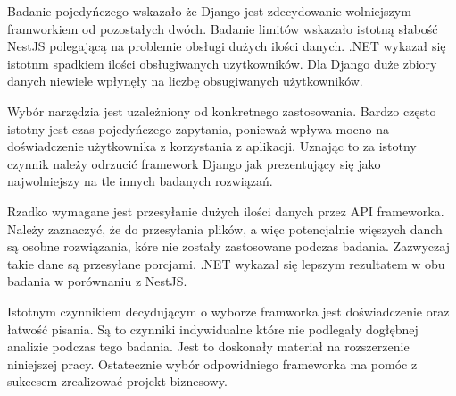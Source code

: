Badanie pojedyńczego wskazało że Django jest zdecydowanie wolniejszym framworkiem od pozostałych dwóch.
Badanie limitów wskazało istotną słabość NestJS polegającą na problemie obsługi dużych ilości danych. .NET wykazał się istotnm spadkiem ilości obsługiwanych uzytkowników.
Dla Django duże zbiory danych niewiele wpłynęły na liczbę obsugiwanych użytkowników.

Wybór narzędzia jest uzależniony od konkretnego zastosowania.
Bardzo często istotny jest czas pojedyńczego zapytania, ponieważ wpływa mocno na doświadczenie użytkownika z korzystania z aplikacji.
Uznając to za istotny czynnik należy odrzucić framework Django jak prezentujący się jako najwolniejszy na tle innych badanych rozwiązań.

Rzadko wymagane jest przesyłanie dużych ilości danych przez API frameworka.
Należy zaznaczyć, że do przesyłania plików, a więc potencjalnie więszych danch są osobne rozwiązania, kóre nie zostały zastosowane podczas badania.
Zazwyczaj takie dane są przesyłane porcjami.
.NET wykazał się lepszym rezultatem w obu badania w porównaniu z NestJS.

Istotnym czynnikiem decydującym o wyborze framworka jest doświadczenie oraz łatwość pisania.
Są to czynniki indywidualne które nie podlegały dogłębnej analizie podczas tego badania.
Jest to doskonały materiał na rozszerzenie niniejszej pracy.
Ostatecznie wybór odpowidniego frameworka ma pomóc z sukcesem zrealizować projekt biznesowy.